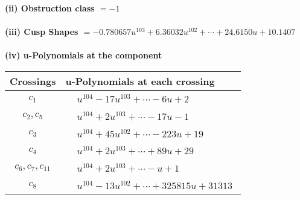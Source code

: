 \documentclass[1p]{elsarticle_modified}
\theoremstyle{definition}
\begin{document}
\flushleft \textbf{(ii) Obstruction class $= -1$}\\~\\
\flushleft \textbf{(iii) Cusp Shapes $= -0.780657 u^{103}+6.36032 u^{102}+\cdots+24.6150 u+10.1407$}\\~\\
\newpage\renewcommand{\arraystretch}{1}
\flushleft \textbf{(iv) u-Polynomials at the component}\newline \\
\begin{tabular}{m{50pt}|m{274pt}}
Crossings & \hspace{64pt}u-Polynomials at each crossing \\
\hline $$\begin{aligned}c_{1}\end{aligned}$$&$\begin{aligned}
&u^{104}-17 u^{103}+\cdots-6 u+2
\end{aligned}$\\
\hline $$\begin{aligned}c_{2},c_{5}\end{aligned}$$&$\begin{aligned}
&u^{104}+2 u^{103}+\cdots-17 u-1
\end{aligned}$\\
\hline $$\begin{aligned}c_{3}\end{aligned}$$&$\begin{aligned}
&u^{104}+45 u^{102}+\cdots-223 u+19
\end{aligned}$\\
\hline $$\begin{aligned}c_{4}\end{aligned}$$&$\begin{aligned}
&u^{104}+2 u^{103}+\cdots+89 u+29
\end{aligned}$\\
\hline $$\begin{aligned}c_{6},c_{7},c_{11}\end{aligned}$$&$\begin{aligned}
&u^{104}+2 u^{103}+\cdots- u+1
\end{aligned}$\\
\hline $$\begin{aligned}c_{8}\end{aligned}$$&$\begin{aligned}
&u^{104}-13 u^{102}+\cdots+325815 u+31313
\end{aligned}$\\

\end{tabular}
\end{document}

